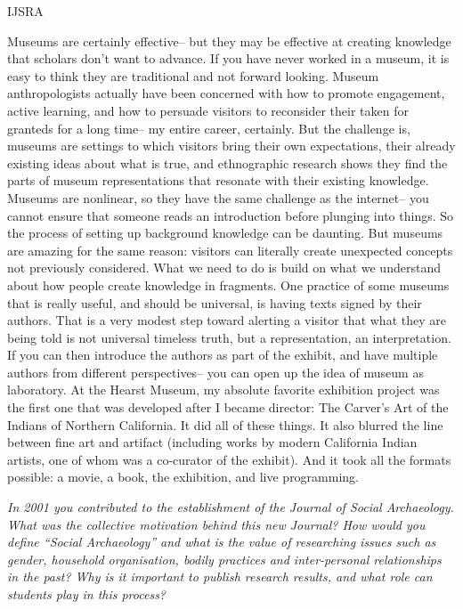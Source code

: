 \begin{labeling}{IJSRA}
\item[RAJ] Museums are certainly effective-- but they may be effective at creating knowledge that scholars don't want to advance. If you have never worked in a museum, it is easy to think they are traditional and not forward looking. Museum anthropologists actually have been concerned with how to promote engagement, active learning, and how to persuade visitors to reconsider their taken for granteds for a long time-- my entire career, certainly. But the challenge is, museums are settings to which visitors bring their own expectations, their already existing ideas about what is true, and ethnographic research shows they find the parts of museum representations that resonate with their existing knowledge. Museums are nonlinear, so they have the same challenge as the internet-- you cannot ensure that someone reads an introduction before plunging into things. So the process of setting up background knowledge can be daunting. But museums are amazing for the same reason: visitors can literally create unexpected concepts not previously considered. What we need to do is build on what we understand about how people create knowledge in fragments. One practice of some museums that is really useful, and should be universal, is having texts signed by their authors. That is a very modest step toward alerting a visitor that what they are being told is not universal timeless truth, but a representation, an interpretation. If you can then introduce the authors as part of the exhibit, and have multiple authors from different perspectives-- you can open up the idea of museum as laboratory. At the Hearst Museum, my absolute favorite exhibition project was the first one that was developed after I became director: The Carver's Art of the Indians of Northern California. It did all of these things. It also blurred the line between fine art and artifact (including works by modern California Indian artists, one of whom was a co-curator of the exhibit). And it took all the formats possible: a movie, a book, the exhibition, and live programming.	

\item[IJSRA] \emph{In 2001 you contributed to the establishment of the Journal of Social Archaeology. What was the collective motivation behind this new Journal? How would you define “Social Archaeology” and what is the value of researching issues such as gender, household organisation, bodily practices and inter-personal relationships in the past? Why is it important to publish research results, and what role can students play in this process?}


\end{labeling}
